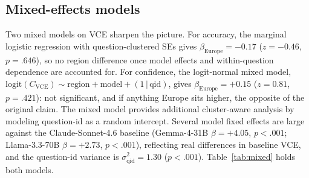 \documentclass[11pt]{article}
\begin{document}
\subsection{Mixed-effects models}

Two mixed models on VCE sharpen the picture. For accuracy, the marginal logistic regression with question-clustered SEs gives $\beta_\text{Europe} = -0.17$ ($z = -0.46$, $p = .646$), so no region difference once model effects and within-question dependence are accounted for. For confidence, the logit-normal mixed model, $\text{logit}(C_\text{VCE}) \sim \text{region} + \text{model} + (1 \,|\, \text{qid})$, gives $\beta_\text{Europe} = +0.15$ ($z = 0.81$, $p = .421$): not significant, and if anything Europe sits higher, the opposite of the original claim. The mixed model provides additional cluster-aware analysis by modeling question-id as a random intercept. Several model fixed effects are large against the Claude-Sonnet-4.6 baseline (Gemma-4-31B $\beta = +4.05$, $p < .001$; Llama-3.3-70B $\beta = +2.73$, $p < .001$), reflecting real differences in baseline VCE, and the question-id variance is $\sigma^2_\text{qid} = 1.30$ ($p < .001$). Table~\ref{tab:mixed} holds both models.
\end{document}
